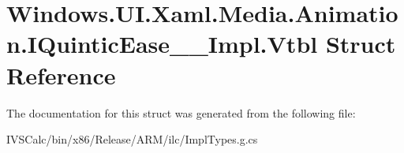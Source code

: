 \hypertarget{struct_windows_1_1_u_i_1_1_xaml_1_1_media_1_1_animation_1_1_i_quintic_ease_____impl_1_1_vtbl}{}\section{Windows.\+U\+I.\+Xaml.\+Media.\+Animation.\+I\+Quintic\+Ease\+\_\+\+\_\+\+Impl.\+Vtbl Struct Reference}
\label{struct_windows_1_1_u_i_1_1_xaml_1_1_media_1_1_animation_1_1_i_quintic_ease_____impl_1_1_vtbl}


The documentation for this struct was generated from the following file\+:\begin{DoxyCompactItemize}
\item 
I\+V\+S\+Calc/bin/x86/\+Release/\+A\+R\+M/ilc/Impl\+Types.\+g.\+cs\end{DoxyCompactItemize}

